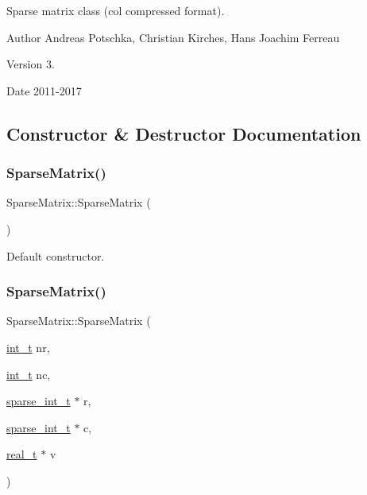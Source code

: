 Sparse matrix class (col compressed format).

\begin{DoxyAuthor}{Author}
Andreas Potschka, Christian Kirches, Hans Joachim Ferreau 
\end{DoxyAuthor}
\begin{DoxyVersion}{Version}
3. 
\end{DoxyVersion}
\begin{DoxyDate}{Date}
2011-\/2017 
\end{DoxyDate}


\subsection{Constructor \& Destructor Documentation}
\mbox{\label{class_sparse_matrix_ac010252479e500b34324cb10c9dd4e98}} 
\subsubsection{\texorpdfstring{Sparse\+Matrix()}{SparseMatrix()}\hspace{0.1cm}{\footnotesize\ttfamily [1/3]}}
{\footnotesize\ttfamily Sparse\+Matrix\+::\+Sparse\+Matrix (\begin{DoxyParamCaption}{ }\end{DoxyParamCaption})}

Default constructor. \mbox{\label{class_sparse_matrix_a217f2c93982407f7b8b81c189be329bd}} 
\subsubsection{\texorpdfstring{Sparse\+Matrix()}{SparseMatrix()}\hspace{0.1cm}{\footnotesize\ttfamily [2/3]}}
{\footnotesize\ttfamily Sparse\+Matrix\+::\+Sparse\+Matrix (\begin{DoxyParamCaption}\item[{\hyperlink{_types_8hpp_ab6fd6105e64ed14a0c9281326f05e623}{int\+\_\+t}}]{nr,  }\item[{\hyperlink{_types_8hpp_ab6fd6105e64ed14a0c9281326f05e623}{int\+\_\+t}}]{nc,  }\item[{\hyperlink{_types_8hpp_aa5432b00c9081e2d62d7f38c32e4ed80}{sparse\+\_\+int\+\_\+t} $\ast$}]{r,  }\item[{\hyperlink{_types_8hpp_aa5432b00c9081e2d62d7f38c32e4ed80}{sparse\+\_\+int\+\_\+t} $\ast$}]{c,  }\item[{\hyperlink{qp_o_a_s_e_s__wrapper_8h_a0d00e2b3dfadee81331bbb39068570c4}{real\+\_\+t} $\ast$}]{v }\end{DoxyParamCaption})}


